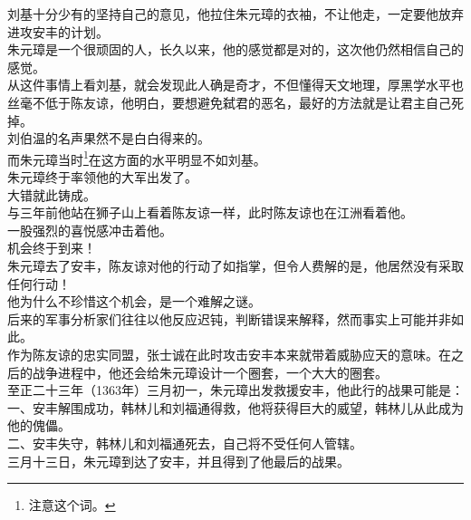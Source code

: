 \begin{multicols}{\theparacolNo}
刘基十分少有的坚持自己的意见，他拉住朱元璋的衣袖，不让他走，一定要他放弃进攻安丰的计划。\\

朱元璋是一个很顽固的人，长久以来，他的感觉都是对的，这次他仍然相信自己的感觉。\\

从这件事情上看刘基，就会发现此人确是奇才，不但懂得天文地理，厚黑学水平也丝毫不低于陈友谅，他明白，要想避免弑君的恶名，最好的方法就是让君主自己死掉。\\

刘伯温的名声果然不是白白得来的。\\

而朱元璋当时\footnote{注意这个词。}在这方面的水平明显不如刘基。\\

朱元璋终于率领他的大军出发了。\\

大错就此铸成。\\

与三年前他站在狮子山上看着陈友谅一样，此时陈友谅也在江洲看着他。\\

一股强烈的喜悦感冲击着他。\\

机会终于到来！\\

朱元璋去了安丰，陈友谅对他的行动了如指掌，但令人费解的是，他居然没有采取任何行动！\\

他为什么不珍惜这个机会，是一个难解之谜。\\

后来的军事分析家们往往以他反应迟钝，判断错误来解释，然而事实上可能并非如此。\\

作为陈友谅的忠实同盟，张士诚在此时攻击安丰本来就带着威胁应天的意味。在之后的战争进程中，他还会给朱元璋设计一个圈套，一个大大的圈套。\\

至正二十三年（1363年）三月初一，朱元璋出发救援安丰，他此行的战果可能是：\\

一、安丰解围成功，韩林儿和刘福通得救，他将获得巨大的威望，韩林儿从此成为他的傀儡。\\

二、安丰失守，韩林儿和刘福通死去，自己将不受任何人管辖。\\

三月十三日，朱元璋到达了安丰，并且得到了他最后的战果。\\


\end{multicols}
